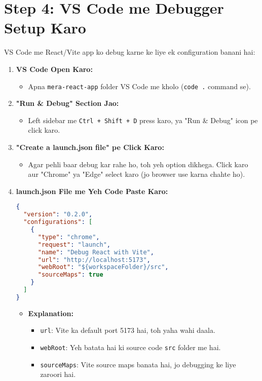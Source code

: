\documentclass[a4paper,12pt]{article}
\begin{document}
\section{ Step 4: VS Code me Debugger Setup Karo}
VS Code me React/Vite app ko debug karne ke liye ek configuration banani hai:  
\begin{enumerate}
    \item \textbf{\color{myblue}VS Code Open Karo:}  
    \begin{itemize}
        \item Apna \texttt{\color{mygreen}mera-react-app} folder VS Code me kholo (\texttt{\color{mygreen}code .} command se).
    \end{itemize}

    \item \textbf{\color{myblue}"Run \& Debug" Section Jao:}  
    \begin{itemize}
        \item Left sidebar me \texttt{\color{mygreen}Ctrl + Shift + D} press karo, ya "Run \& Debug" icon pe click karo.
    \end{itemize}

    \item \textbf{\color{myblue}"Create a launch.json file" pe Click Karo:}  
    \begin{itemize}
        \item Agar pehli baar debug kar rahe ho, toh yeh option dikhega. Click karo aur "Chrome" ya "Edge" select karo (jo browser use karna chahte ho).
    \end{itemize}

    \item \textbf{\color{myblue}launch.json File me Yeh Code Paste Karo:}  
    \begin{lstlisting}[language=JSON]
{
  "version": "0.2.0",
  "configurations": [
    {
      "type": "chrome",
      "request": "launch",
      "name": "Debug React with Vite",
      "url": "http://localhost:5173",
      "webRoot": "${workspaceFolder}/src",
      "sourceMaps": true
    }
  ]
}
    \end{lstlisting}
    \begin{itemize}
        \item \textbf{\color{myblue}Explanation:}  
        \begin{itemize}
            \item \texttt{\color{mygreen}url}: Vite ka default port 5173 hai, toh yaha wahi daala.
            \item \texttt{\color{mygreen}webRoot}: Yeh batata hai ki source code \texttt{\color{mygreen}src} folder me hai.
            \item \texttt{\color{mygreen}sourceMaps}: Vite source maps banata hai, jo debugging ke liye zaroori hai.
        \end{itemize}



\end{itemize}
\end{enumerate}
\end{document}
